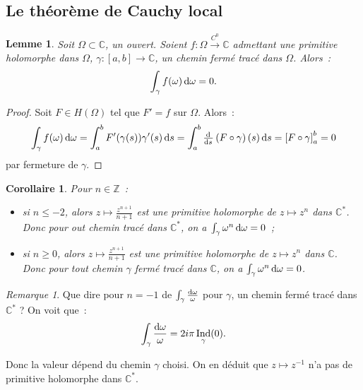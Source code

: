 \documentclass{report}
\newtheorem{cor}[thm]{Corollaire}
\newtheorem{lem}[thm]{Lemme}
\theoremstyle{definition}
\theoremstyle{remark}
\newtheorem*{rmq}{Remarque}
\numberwithin{equation}{section}
\newcommand{\C}{\mathbb C}
\newcommand{\Z}{\mathbb Z}
\DeclareMathOperator{\Ind}{Ind}
\newcommand{\toC}[1]{\xrightarrow{C^{#1}}}
\newcommand{\tocont}{\toC 0}
\begin{document}
		\subsection{Le théorème de Cauchy local}
			\begin{lem} Soit $\Omega \subset \C$, un ouvert. Soient $f : \Omega \tocont \C$ admettant une primitive holomorphe dans $\Omega$, $\gamma : [a, b] \to \C$,
			un chemin fermé tracé dans $\Omega$. Alors~:
			\begin{equation}
				\int_\gamma f(\omega)\dif \omega = 0.
			\end{equation}
			\end{lem}

			\begin{proof} Soit $F \in H(\Omega)$ tel que $F' = f$ sur $\Omega$. Alors~:
			\begin{equation}
				\int_\gamma f(\omega)\dif \omega = \int_a^b F'(\gamma(s))\gamma'(s)\dif s = \int_a^b \od {}s\left(F \circ \gamma\right)(s)\dif s = \left[F \circ \gamma\right]_a^b = 0
			\end{equation}
			par fermeture de $\gamma$.
			\end{proof}

			\begin{cor} Pour $n \in \Z$~:
			\begin{itemize}
				\item si $n \leq -2$, alors $z \mapsto \frac {z^{n+1}}{n+1}$ est une primitive holomorphe de $z \mapsto z^n$ dans $\C^*$. Donc pour out chemin tracé dans
				$\C^*$, on a $\int_\gamma \omega^n\dif \omega = 0$~;
				\item si $n \geq 0$, alors $z \mapsto \frac {z^{n+1}}{n+1}$ est une primitive holomorphe de $z \mapsto z^n$ dans $\C$. Donc pour tout chemin $\gamma$
				fermé tracé dans $\C$, on a $\int_\gamma \omega^n\dif \omega = 0$.
			\end{itemize}
			\end{cor}

			\begin{rmq} Que dire pour $n=-1$ de $\int_\gamma \frac {\dif \omega}{\omega}$ pour $\gamma$, un chemin fermé tracé dans $\C^*$ ? On voit que~:
			\begin{equation}
				\int_\gamma\frac {\dif \omega}\omega = 2i\pi \Ind_\gamma(0).
			\end{equation}

			Donc la valeur dépend du chemin $\gamma$ choisi. On en déduit que $z \mapsto z^{-1}$ n'a pas de primitive holomorphe dans $\C^*$.
			\end{rmq}
\end{document}
